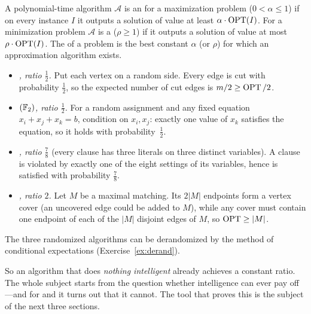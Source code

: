 \begin{definition}\label{def:approx}
A polynomial-time algorithm $\mathcal A$ is an  for a
maximization problem ($0<\alpha\le1$) if on every instance $I$ it outputs a solution of value
at least $\alpha\cdot\operatorname{OPT}(I)$.  For a minimization problem $\mathcal A$ is a
 ($\rho\ge1$) if it outputs a solution of value at most
$\rho\cdot\operatorname{OPT}(I)$.  The  of a problem is the best constant
$\alpha$ (or $\rho$) for which an approximation algorithm exists.
\end{definition}

\begin{example}\label{ex:random}
\leavevmode
\begin{itemize}
  \item \emph{, ratio $\tfrac12$.}  Put each vertex on a random side.  Every edge is
        cut with probability $\tfrac12$, so the expected number of cut edges is $m/2\ge\operatorname{OPT}/2$.
  \item \emph{$(\mathbb{F}_2)$, ratio $\tfrac12$.}  For a random assignment and any
        fixed equation $x_i+x_j+x_k=b$, condition on $x_i,x_j$: exactly one value of $x_k$
        satisfies the equation, so it holds with probability~$\tfrac12$.
  \item \emph{, ratio $\tfrac78$} (every clause has three literals on three
        distinct variables).  A clause is violated by exactly one of the eight settings of its
        variables, hence is satisfied with probability $\tfrac78$.
  \item \emph{, ratio $2$.}  Let $M$ be a maximal matching.  Its $2|M|$
        endpoints form a vertex cover (an uncovered edge could be added to $M$), while any
        cover must contain one endpoint of each of the $|M|$ disjoint edges of $M$, so
        $\operatorname{OPT}\ge|M|$.
\end{itemize}
The three randomized algorithms can be derandomized by the method of conditional
expectations (Exercise~\ref{ex:derand}).
\end{example}

So an algorithm that does \emph{nothing intelligent} already achieves a constant ratio.  The
whole subject starts from the question whether intelligence can ever pay off---and for
 and  it turns out that it cannot.  The tool that proves this is the
subject of the next three sections.


